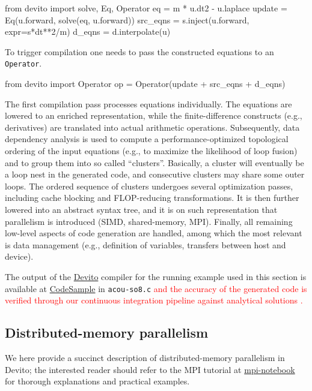 \documentclass[10pt, conference]{IEEEtran}
\newcommand{\devito}{\href{https://github.com/devitocodes/devito}{Devito} }
\begin{document}
\begin{python}[label=WE, caption=Wave-equation symbolic definition]
from devito import solve, Eq, Operator
eq = m * u.dt2 - u.laplace
update = Eq(u.forward, solve(eq, u.forward))
src_eqns = s.inject(u.forward, expr=s*dt**2/m)
d_eqns = d.interpolate(u)
\end{python}

To trigger compilation one needs to pass the constructed equations to an
\texttt{Operator}.

\begin{python}[label=op, caption=Operator creation]
from devito import Operator
op = Operator(update + src_eqns + d_eqns)
\end{python}

The first compilation pass processes equations individually. The
equations are lowered to an enriched representation, while the
finite-difference constructs (e.g., derivatives) are translated into
actual arithmetic operations. Subsequently, data dependency analysis is
used to compute a performance-optimized topological ordering of the
input equations (e.g., to maximize the likelihood of loop fusion) and to
group them into so called ``clusters''. Basically, a cluster will
eventually be a loop nest in the generated code, and consecutive
clusters may share some outer loops. The ordered sequence of clusters
undergoes several optimization passes, including cache blocking and
FLOP-reducing transformations. It is then further lowered into an
abstract syntax tree, and it is on such representation that parallelism
is introduced (SIMD, shared-memory, MPI). Finally, all remaining
low-level aspects of code generation are handled, among which the most
relevant is data management (e.g., definition of variables,
transfers between host and device).

The output of the \devito compiler for the running example used in this
section is available at
\href{https://github.com/mloubout/SC20Paper/tree/master/codesamples}{CodeSample}
in \texttt{acou-so8.c} \textcolor{red}{and the accuracy of the generated code is verified through our
continuous integration pipeline against analytical solutions \cite{devito-api}.}

\subsection{Distributed-memory
parallelism}\label{distributed-memory-parallelism}

We here provide a succinct description of distributed-memory parallelism
in Devito; the interested reader should refer to the MPI tutorial at
\href{https://github.com/devitocodes/devito/blob/v4.2/examples/mpi/overview.ipynb}{mpi-notebook}
for thorough explanations and practical examples.
\end{document}
